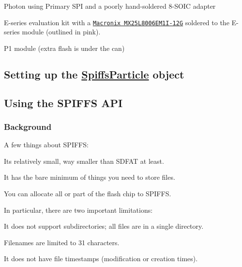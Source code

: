 \begin{DoxyItemize}
\item Photon using Primary S\+PI and a poorly hand-\/soldered 8-\/\+S\+O\+IC adapter
\end{DoxyItemize}


\begin{DoxyItemize}
\item E-\/series evaluation kit with a \href{https://www.digikey.com/product-detail/en/macronix/MX25L8006EM1I-12G/1092-1117-ND/2744800}{\tt Macronix M\+X25\+L8006\+E\+M1\+I-\/12G} soldered to the E-\/series module (outlined in pink).
\end{DoxyItemize}


\begin{DoxyItemize}
\item P1 module (extra flash is under the can)
\end{DoxyItemize}

 \subsection*{Setting up the \mbox{\hyperlink{class_spiffs_particle}{Spiffs\+Particle}} object}

\subsection*{Using the S\+P\+I\+F\+FS A\+PI}

\subsubsection*{Background}

A few things about S\+P\+I\+F\+FS\+:


\begin{DoxyItemize}
\item It\textquotesingle{}s relatively small, way smaller than S\+D\+F\+AT at least.
\item It has the bare minimum of things you need to store files.
\item You can allocate all or part of the flash chip to S\+P\+I\+F\+FS.
\end{DoxyItemize}

In particular, there are two important limitations\+:


\begin{DoxyItemize}
\item It does not support subdirectories; all files are in a single directory.
\item Filenames are limited to 31 characters.
\item It does not have file timestamps (modification or creation times).
\end{DoxyItemize}


